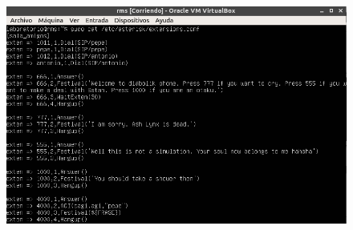 \documentclass[11pt,a4paper]{article}
\begin{document}
\begin{figure}[H]
	\centering
	\includegraphics[scale=0.5]{img/19.png}
\end{figure}
\end{document}
